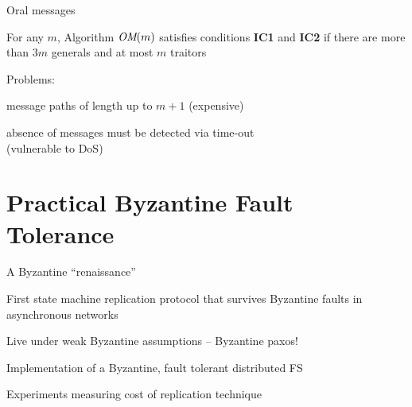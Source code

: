\begin{frame}{Oral messages}
	
\begin{theorem}
For any $m$, Algorithm $\textit{OM}(m)$ satisfies conditions \textbf{IC1} and \textbf{IC2} if there are more than $3m$ generals and at most $m$ traitors
\end{theorem}

\bigskip
\BIL
\item Problems:
\BI
\item message paths of length up to $m+1$  (expensive)
\item absence of messages must be detected via time-out\\ (vulnerable to DoS)	
\EI
\EIL


\end{frame}

\section{Practical Byzantine Fault Tolerance}

\begin{frame}{A Byzantine “renaissance”}
		
\begin{Bib}
\end{Bib}	

\smallskip
{}
\BIL
\item First state machine replication protocol that survives Byzantine faults in asynchronous networks
\item Live under weak Byzantine assumptions – Byzantine paxos!
\item Implementation of a Byzantine, fault tolerant distributed FS
\item Experiments measuring cost of replication technique
\EIL
		
\end{frame}

